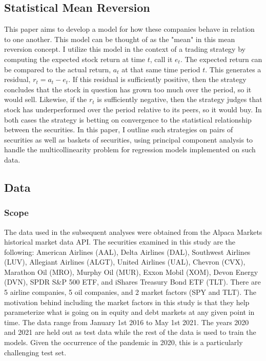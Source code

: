 \documentclass{article}
\begin{document}
\subsection{Statistical Mean Reversion}
This paper aims to develop a model for how these companies behave in relation
to one another. This model can be thought of as the "mean" in this mean reversion concept. I
utilize this model in the context of a trading strategy by computing the expected stock return 
at time $t$, call it $e_t$. The expected return can be compared to the actual return, $a_t$
at that same time period $t$. This generates a residual, $r_t = a_t - e_t$. If this residual
is sufficiently positive, then the strategy concludes that the stock in question has grown too 
much over the period, so it would sell. Likewise, if the $r_t$ is sufficiently negative, then the 
strategy judges that stock has underperformed over the period relative to its peers, so it would buy. In both cases
the strategy is betting on convergence to the statistical relationship between the securities.
In this paper, I outline such strategies on pairs of securities as well as baskets of securities,
using principal component analysis to handle the multicollinearity problem for regression
models implemented on such data.

\subsection{Data}
\subsubsection{Scope}
The data used in the subsequent analyses were obtained from the Alpaca Markets historical 
market data API. The securities examined in this study are the following: American Airlines
(AAL), Delta Airlines (DAL), Southwest Airlines (LUV), Allegiant Airlines (ALGT), United
Airlines (UAL), Chevron (CVX), Marathon Oil (MRO), Murphy Oil (MUR), Exxon Mobil (XOM),
Devon Energy (DVN), SPDR S\&P 500 ETF, and iShares Treasury Bond ETF (TLT). There 
are 5 airline companies, 5 oil companies, and 2 market factors (SPY and TLT). The motivation
behind including the market factors in this study is that they help parameterize what is going
on in equity and debt markets at any given point in time.
The data range from January 1st
2016 to May 1st 2021. The years 2020 and 2021 are held out as test data while the
rest of the data is used to train the models. Given the occurrence of the pandemic in 2020,
this is a particularly challenging test set. 
\end{document}
